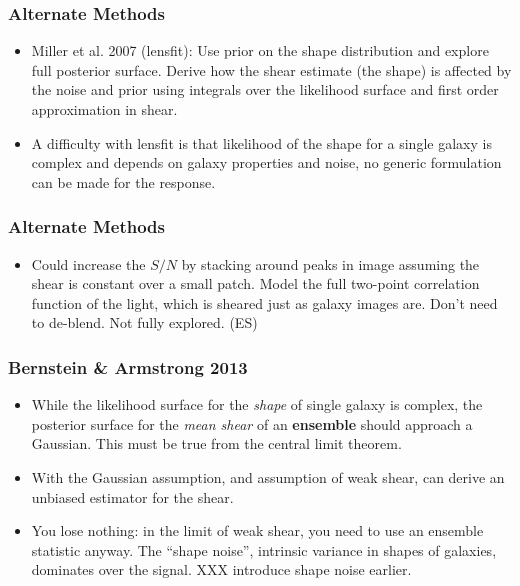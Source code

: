 \documentclass{beamer}
\begin{document}
\frame
{
    \frametitle{Alternate Methods}

    \begin{itemize}

        \item Miller et al. 2007 (lensfit): Use prior on the shape distribution
            and explore full posterior surface. Derive how the shear estimate
            (the shape) is affected by the noise and prior using integrals over
            the likelihood surface and first order approximation in shear.

        \item A difficulty with lensfit is that likelihood of the shape for a
            single galaxy is complex and depends on galaxy properties and
            noise, no generic formulation can be made for the response.

    \end{itemize}
}

\frame
{
    \frametitle{Alternate Methods}

    \begin{itemize}

        \item Could increase the $S/N$ by stacking around peaks in image
            assuming the shear is constant over a small patch.  Model the full
            two-point correlation function of the light, which is sheared just
            as galaxy images are.  Don't need to de-blend.  Not fully explored.
            (ES)
    \end{itemize}
}
\frame
{
    \frametitle{Bernstein \& Armstrong 2013}

    \begin{itemize}

        \item While the likelihood surface for the {\it shape} of
            single galaxy is complex, the posterior surface for the
            {\it mean shear} of an {\bf ensemble} should approach a
            Gaussian.  This must be true from the central limit
            theorem.

         \item With the Gaussian assumption, and assumption of weak
             shear, can derive an unbiased estimator for the shear.

         \item You lose nothing: in the limit of weak shear, you need
             to use an ensemble statistic anyway.  The ``shape noise'',
             intrinsic variance in shapes of galaxies, dominates over
             the signal. XXX introduce shape noise earlier.


    \end{itemize}

}
\end{document}
